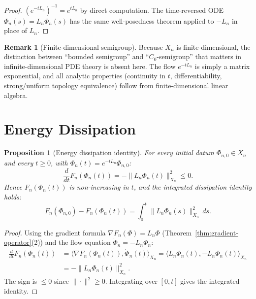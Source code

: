 \documentclass[11pt, a4paper]{amsart}
\newtheorem{proposition}[theorem]{Proposition}
\theoremstyle{definition}
\newtheorem{remark}[theorem]{Remark}
\begin{document}
\begin{proof}
$(e^{-t L_n})^{-1} = e^{t L_n}$ by direct computation. The
time-reversed ODE $\dot \Phi_n(s) = L_n \Phi_n(s)$ has the same
well-posedness theorem applied to $-L_n$ in place of $L_n$.
\end{proof}

\begin{remark}[Finite-dimensional semigroup]
\label{rmk:finite-dim-semigroup}
Because $X_n$ is finite-dimensional, the distinction between
``bounded semigroup'' and ``$C_0$-semigroup'' that matters in
infinite-dimensional PDE theory is absent here. The flow
$e^{-t L_n}$ is simply a matrix exponential, and all analytic
properties (continuity in $t$, differentiability, strong/uniform
topology equivalence) follow from finite-dimensional linear
algebra.
\end{remark}

\section{Energy Dissipation}
\label{sec:energy}

\begin{proposition}[Energy dissipation identity]
\label{prop:energy-dissipation}
For every initial datum $\Phi_{n, 0} \in X_n$ and every $t \geq
0$, with $\Phi_n(t) = e^{-t L_n} \Phi_{n, 0}$:
\[
  \frac{d}{dt} F_n(\Phi_n(t)) = -\|L_n \Phi_n(t)\|^2_{X_n} \leq 0.
\]
Hence $F_n(\Phi_n(t))$ is non-increasing in $t$, and the integrated
dissipation identity holds:
\[
  F_n(\Phi_{n, 0}) - F_n(\Phi_n(t)) = \int_0^t \|L_n \Phi_n(s)
  \|^2_{X_n} \, ds.
\]
\end{proposition}

\begin{proof}
Using the gradient formula $\nabla F_n(\Phi) = L_n \Phi$
(Theorem~\ref{thm:gradient-operator}(2)) and the flow equation
$\dot \Phi_n = -L_n \Phi_n$:
\begin{align*}
  \frac{d}{dt} F_n(\Phi_n(t))
  &= \langle \nabla F_n(\Phi_n(t)), \dot \Phi_n(t) \rangle_{X_n}
  = \langle L_n \Phi_n(t), -L_n \Phi_n(t) \rangle_{X_n} \\
  &= -\|L_n \Phi_n(t)\|^2_{X_n}.
\end{align*}
The sign is $\leq 0$ since $\|\cdot\|^2 \geq 0$. Integrating over
$[0, t]$ gives the integrated identity.
\end{proof}
\end{document}
